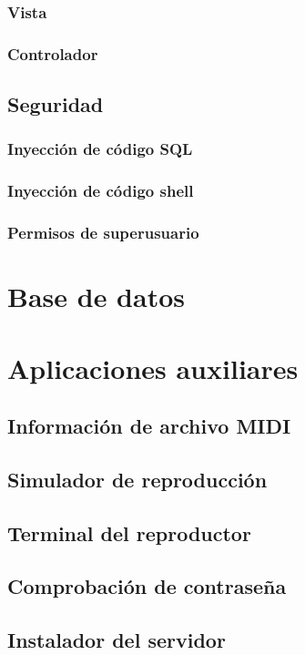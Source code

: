 \subsubsection{Vista}
\subsubsection{Controlador}

\subsection{Seguridad}
\subsubsection{Inyección de código SQL}
\subsubsection{Inyección de código shell}
\subsubsection{Permisos de superusuario}


\section{Base de datos}

\section{Aplicaciones auxiliares}
\subsection{Información de archivo MIDI}
\subsection{Simulador de reproducción}
\subsection{Terminal del reproductor}
\subsection{Comprobación de contraseña}
\subsection{Instalador del servidor}